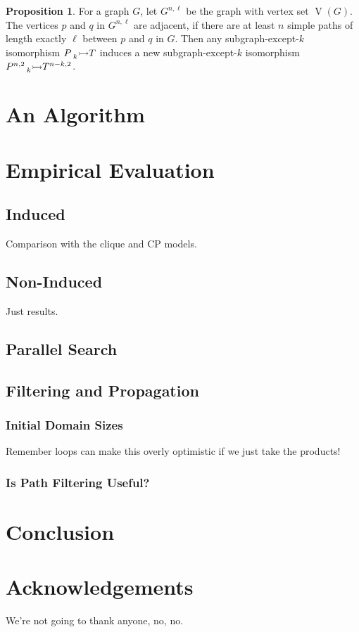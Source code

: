 \documentclass[letterpaper]{article}
\theoremstyle{definition}
\newtheorem{proposition}{Proposition}
\begin{document}
\begin{proposition}
    For a graph $G$, let $G^{n, \ell}$ be the graph with vertex set $\operatorname{V}(G)$. The
    vertices $p$ and $q$ in $G^{n, \ell}$ are adjacent, if there are at least $n$ simple paths of
    length exactly $\ell$ between $p$ and $q$ in $G$. Then any subgraph-except-$k$ isomorphism
    $P \prescript{}{k}{\rightarrowtail} T$ induces a new subgraph-except-$k$ isomorphism
    $P^{n, 2}\prescript{}{k}{\rightarrowtail} T^{n - k, 2}$.
\end{proposition}

\section{An Algorithm}

\section{Empirical Evaluation}

\subsection{Induced}

Comparison with the clique and CP models.

\subsection{Non-Induced}

Just results.

\subsection{Parallel Search}

\subsection{Filtering and Propagation}

\subsubsection{Initial Domain Sizes}

Remember loops can make this overly optimistic if we just take the products!

\subsubsection{Is Path Filtering Useful?}

\section{Conclusion}

\section*{Acknowledgements}

We're not going to thank anyone, no, no.



\end{document}
